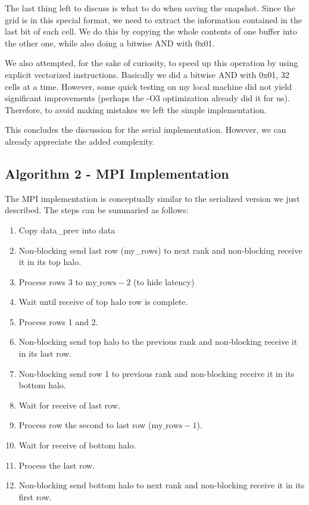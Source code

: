 \documentclass{report}
\begin{document}
The last thing left to discuss is what to do when saving the snapshot. Since 
the grid is in this special format, we need to extract the information contained 
in the last bit of each cell. We do this by copying the whole contents of one 
buffer into the other one, while also doing a bitwise AND with 0x01.

We also attempted, for the sake of curiosity, to speed up this operation by using 
explicit vectorized instructions. Basically we did a bitwise AND with 0x01, 32 
cells at a time. However, some quick testing on my local machine did not yield 
significant improvements (perhaps the -O3 optimization already did it for us). 
Therefore, to avoid making mistakes we left the simple implementation.

This concludes the discussion for the serial implementation. However, we can 
already appreciate the added complexity.

\subsection{Algorithm 2 - MPI Implementation}

The MPI implementation is conceptually similar to the serialized version we just 
described. The steps can be summaried as follows:

\begin{enumerate}
    \item Copy data\_prev into data
    \item Non-blocking send last row (my\_rows) to next rank and non-blocking receive it in its top halo.
    \item Process rows 3 to $\text{my\_rows} - 2$ (to hide latency)
    \item Wait until receive of top halo row is complete.
    \item Process rows 1 and 2.
    \item Non-blocking send top halo to the previous rank and non-blocking receive it in its last row.
    \item Non-blocking send row 1 to previous rank and non-blocking receive it in its bottom halo.
    \item Wait for receive of last row.
    \item Process row the second to last row ($\text{my\_rows} -1$).
    \item Wait for receive of bottom halo. 
    \item Process the last row.
    \item Non-blocking send bottom halo to next rank and non-blocking receive it in its first row. 
\end{enumerate}
\end{document}
